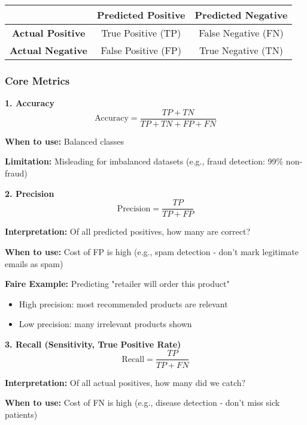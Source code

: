 \documentclass[11pt,letterpaper]{article}
\begin{document}
\begin{center}
\begin{tabular}{|c|c|c|}
\hline
& \textbf{Predicted Positive} & \textbf{Predicted Negative} \\
\hline
\textbf{Actual Positive} & True Positive (TP) & False Negative (FN) \\
\hline
\textbf{Actual Negative} & False Positive (FP) & True Negative (TN) \\
\hline
\end{tabular}
\end{center}

\subsubsection{Core Metrics}

\textbf{1. Accuracy}
\begin{equation}
\text{Accuracy} = \frac{TP + TN}{TP + TN + FP + FN}
\end{equation}

\textbf{When to use:} Balanced classes

\textbf{Limitation:} Misleading for imbalanced datasets (e.g., fraud detection: 99\% non-fraud)

\textbf{2. Precision}
\begin{equation}
\text{Precision} = \frac{TP}{TP + FP}
\end{equation}

\textbf{Interpretation:} Of all predicted positives, how many are correct?

\textbf{When to use:} Cost of FP is high (e.g., spam detection - don't mark legitimate emails as spam)

\textbf{Faire Example:} Predicting "retailer will order this product"
\begin{itemize}
    \item High precision: most recommended products are relevant
    \item Low precision: many irrelevant products shown
\end{itemize}

\textbf{3. Recall (Sensitivity, True Positive Rate)}
\begin{equation}
\text{Recall} = \frac{TP}{TP + FN}
\end{equation}

\textbf{Interpretation:} Of all actual positives, how many did we catch?

\textbf{When to use:} Cost of FN is high (e.g., disease detection - don't miss sick patients)
\end{document}
